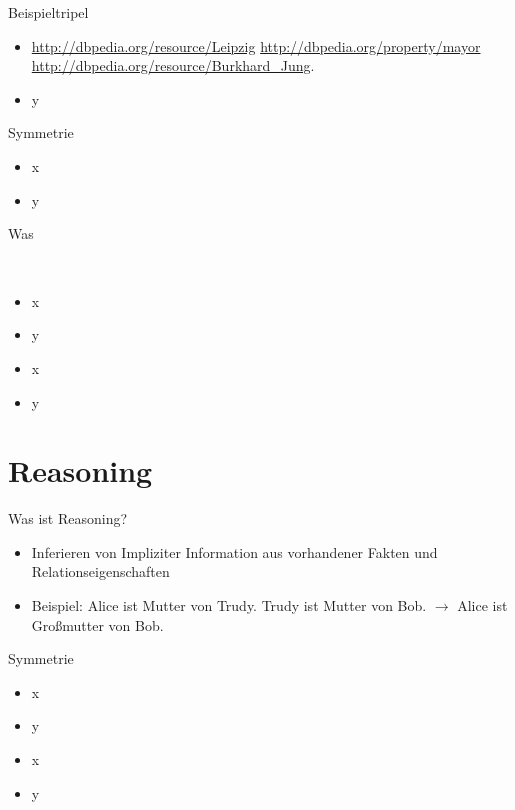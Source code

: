 \documentclass[14pt]{beamer}
\begin{document}
\begin{frame}{Beispieltripel}
\begin{itemize}
\item \url{http://dbpedia.org/resource/Leipzig} \url{http://dbpedia.org/property/mayor} \url{http://dbpedia.org/resource/Burkhard\_Jung}.
\item y
\end{itemize}
\end{frame}

\begin{frame}{Symmetrie}
\begin{itemize}
\item x
\item y
\end{itemize}
\end{frame}

\begin{frame}{Was }
{
\begin{tabular}{ll}
\end{tabular}
}
{
\begin{tabular}{ll}
\end{tabular}
}
\end{frame}

\begin{frame}{}
\begin{block}{}
\begin{itemize}
\item x
\item y
\end{itemize}
\end{block}
\end{frame}

\begin{frame}{}
\begin{itemize}
\item x
\item y
\end{itemize}
\end{frame}

\section{Reasoning}

\begin{frame}{Was ist Reasoning?}
\begin{itemize}
\item Inferieren von Impliziter Information aus vorhandener Fakten und Relationseigenschaften
\item Beispiel: Alice ist Mutter von Trudy. Trudy ist Mutter von Bob. $\rightarrow$ Alice ist Großmutter von Bob. 
\end{itemize}
\end{frame}

\begin{frame}{Symmetrie}
\begin{itemize}
\item x
\item y
\end{itemize}
\end{frame}

\begin{frame}{}
\begin{itemize}
\item x
\item y
\end{itemize}
\end{frame}
\end{document}
